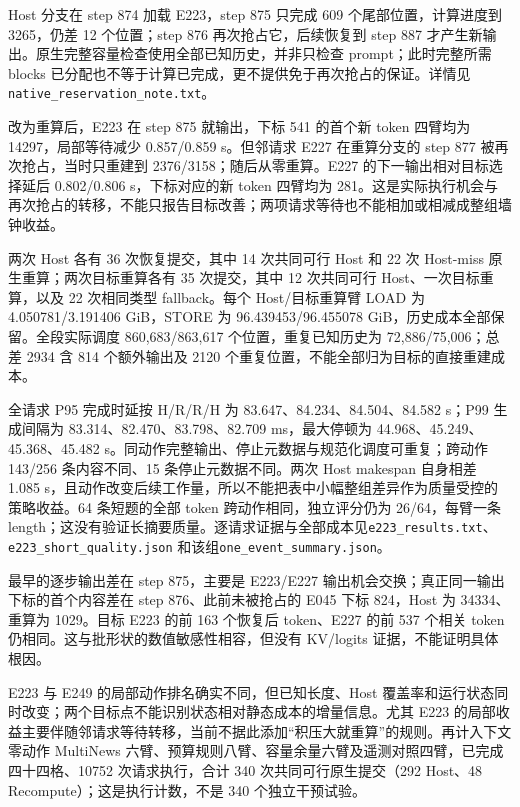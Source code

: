 \documentclass[UTF8,fontset=fandol,a4paper,10pt]{ctexart}
\newcommand{\code}[1]{\nolinkurl{#1}}
\begin{document}
Host 分支在 step 874 加载 E223，step 875 只完成 609 个尾部位置，计算进度到 3265，仍差 12 个位置；step 876 再次抢占它，后续恢复到 step 887 才产生新输出。原生完整容量检查使用全部已知历史，并非只检查 prompt；此时完整所需 blocks 已分配也不等于计算已完成，更不提供免于再次抢占的保证。详情见\code{native_reservation_note.txt}。

改为重算后，E223 在 step 875 就输出，下标 541 的首个新 token 四臂均为 14297，局部等待减少 0.857/0.859 s。但邻请求 E227 在重算分支的 step 877 被再次抢占，当时只重建到 2376/3158；随后从零重算。E227 的下一输出相对目标选择延后 0.802/0.806 s，下标对应的新 token 四臂均为 281。这是实际执行机会与再次抢占的转移，不能只报告目标改善；两项请求等待也不能相加或相减成整组墙钟收益。

两次 Host 各有 36 次恢复提交，其中 14 次共同可行 Host 和 22 次 Host-miss 原生重算；两次目标重算各有 35 次提交，其中 12 次共同可行 Host、一次目标重算，以及 22 次相同类型 fallback。每个 Host/目标重算臂 LOAD 为 4.050781/3.191406 GiB，STORE 为 96.439453/96.455078 GiB，历史成本全部保留。全段实际调度 860,683/863,617 个位置，重复已知历史为 72,886/75,006；总差 2934 含 814 个额外输出及 2120 个重复位置，不能全部归为目标的直接重建成本。

全请求 P95 完成时延按 H/R/R/H 为 83.647、84.234、84.504、84.582 s；P99 生成间隔为 83.314、82.470、83.798、82.709 ms，最大停顿为 44.968、45.249、45.368、45.482 s。同动作完整输出、停止元数据与规范化调度可重复；跨动作 143/256 条内容不同、15 条停止元数据不同。两次 Host makespan 自身相差 1.085 s，且动作改变后续工作量，所以不能把表中小幅整组差异作为质量受控的策略收益。64 条短题的全部 token 跨动作相同，独立评分仍为 26/64，每臂一条 length；这没有验证长摘要质量。逐请求证据与全部成本见\code{e223_results.txt}、\code{e223_short_quality.json} 和该组\code{one_event_summary.json}。

最早的逐步输出差在 step 875，主要是 E223/E227 输出机会交换；真正同一输出下标的首个内容差在 step 876、此前未被抢占的 E045 下标 824，Host 为 34334、重算为 1029。目标 E223 的前 163 个恢复后 token、E227 的前 537 个相关 token 仍相同。这与批形状的数值敏感性相容，但没有 KV/logits 证据，不能证明具体根因。

E223 与 E249 的局部动作排名确实不同，但已知长度、Host 覆盖率和运行状态同时改变；两个目标点不能识别状态相对静态成本的增量信息。尤其 E223 的局部收益主要伴随邻请求等待转移，当前不据此添加“积压大就重算”的规则。再计入下文零动作 MultiNews 六臂、预算规则八臂、容量余量六臂及遥测对照四臂，已完成四十四格、10752 次请求执行，合计 340 次共同可行原生提交（292 Host、48 Recompute）；这是执行计数，不是 340 个独立干预试验。
\end{document}
